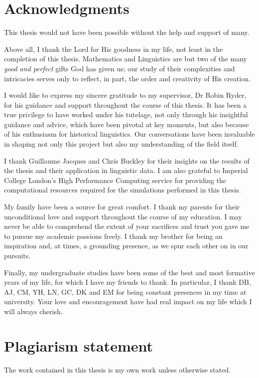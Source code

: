 \documentclass[a4paper,11pt, twoside]{report}
\begin{document}
\clearpage
\section*{Acknowledgments}
This thesis would not have been possible without the help and support of many.

Above all, I thank the Lord for His goodness in my life, not least in the completion of this thesis. Mathematics and Linguistics are but two of the many \textit{good and perfect} gifts God has given us; our study of their complexities and intricacies serves only to reflect, in part, the order and creativity of His creation.

I would like to express my sincere gratitude to my supervisor, Dr Robin Ryder, for his guidance and support throughout the course of this thesis. It has been a true privilege to have worked under his tutelage, not only through his insightful guidance and advice, which have been pivotal at key moments, but also because of his enthusiasm for historical linguistics. Our conversations have been invaluable in shaping not only this project but also my understanding of the field itself. 

I thank Guillaume Jacques and Chris Buckley for their insights on the results of the thesis and their application in linguistic data. I am also grateful to Imperial College London's High Performance Computing service for providing the computational resources required for the simulations performed in this thesis.

My family have been a source for great comfort. I thank my parents for their unconditional love and support throughout the course of my education. I may never be able to comprehend the extent of your sacrifices and trust you gave me to pursue my academic passions freely. I thank my brother for being an inspiration and, at times, a grounding presence, as we spur each other on in our pursuits.

Finally, my undergraduate studies have been some of the best and most formative years of my life, for which I have my friends to thank. In particular, I thank DB, AJ, CM, YH, LN, GC, DK and EM for being constant presences in my time at university. Your love and encouragement have had real impact on my life which I will always cherish.

\clearpage

\clearpage
\section*{Plagiarism statement}
The work contained in this thesis is my own work unless otherwise stated. \\
\end{document}

